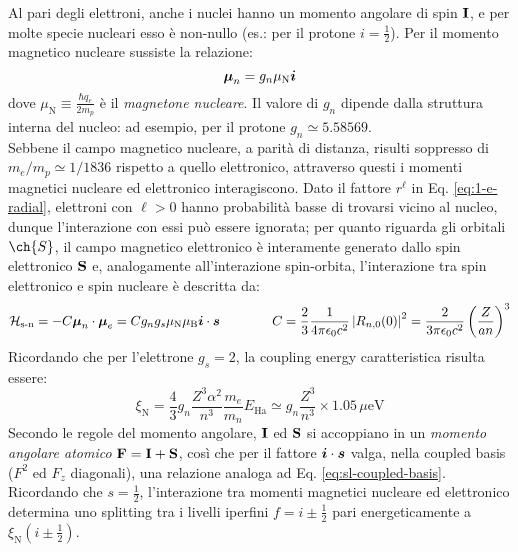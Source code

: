 Al pari degli elettroni, anche i nuclei hanno un momento angolare di spin $ \mathbf{I} $, e per molte specie nucleari esso è non-nullo (es.: per il protone $ i = \tfrac{1}{2} $). Per il momento magnetico nucleare sussiste la relazione:
\begin{equation}
	\boldsymbol{\mu}_n = g_n \mu_\text{N} \boldsymbol{i}
\end{equation}
dove $ \mu_\text{N} \equiv \frac{\hbar q_e}{2m_p} $ è il \textit{magnetone nucleare}. Il valore di $ g_n $ dipende dalla struttura interna del nucleo: ad esempio, per il protone $ g_n \simeq 5.58569 $.\\
Sebbene il campo magnetico nucleare, a parità di distanza, risulti soppresso di $ m_e / m_p \simeq 1 / 1836 $ rispetto a quello elettronico, attraverso questi i momenti magnetici nucleare ed elettronico interagiscono. Dato il fattore $ r^\ell $ in Eq. \ref{eq:1-e-radial}, elettroni con $ \ell > 0 $ hanno probabilità basse di trovarsi vicino al nucleo, dunque l'interazione con essi può essere ignorata; per quanto riguarda gli orbitali $ \ch{S} $, il campo magnetico elettronico è interamente generato dallo spin elettronico $ \mathbf{S} $ e, analogamente all'interazione spin-orbita, l'interazione tra spin elettronico e spin nucleare è descritta da:
\begin{equation*}
	\mathcal{H}_\text{s-n} = - C \boldsymbol{\mu}_n \cdot \boldsymbol{\mu}_e = C g_n g_s \mu_\text{N} \mu_\text{B} \boldsymbol{i} \cdot \boldsymbol{s}
	\qquad \qquad
	C = \frac{2}{3} \frac{1}{4\pi \epsilon_0 c^2} \left\lvert R_{n,0}(0)\right\rvert^2 = \frac{2}{3\pi \epsilon_0 c^2} \left( \frac{Z}{an} \right)^3
\end{equation*}
Ricordando che per l'elettrone $ g_s = 2 $, la coupling energy caratteristica risulta essere:
\begin{equation}
	\xi_\text{N} = \frac{4}{3} g_n \frac{Z^3 \alpha^2}{n^3} \frac{m_e}{m_n} E_\text{Ha} \simeq g_n \frac{Z^3}{n^3} \times 1.05\,\mu\text{eV}
\end{equation}
Secondo le regole del momento angolare, $ \mathbf{I} $ ed $ \mathbf{S} $ si accoppiano in un \textit{momento angolare atomico} $ \mathbf{F} = \mathbf{I} + \mathbf{S} $, così che per il fattore $ \boldsymbol{i} \cdot \boldsymbol{s} $ valga, nella coupled basis ($ F^2 $ ed $ F_z $ diagonali), una relazione analoga ad Eq. \ref{eq:sl-coupled-basis}. Ricordando che $ s = \tfrac{1}{2} $, l'interazione tra momenti magnetici nucleare ed elettronico determina uno splitting tra i livelli iperfini $ f = i \pm \tfrac{1}{2} $ pari energeticamente a $ \xi_\text{N} (i \pm \tfrac{1}{2}) $.

